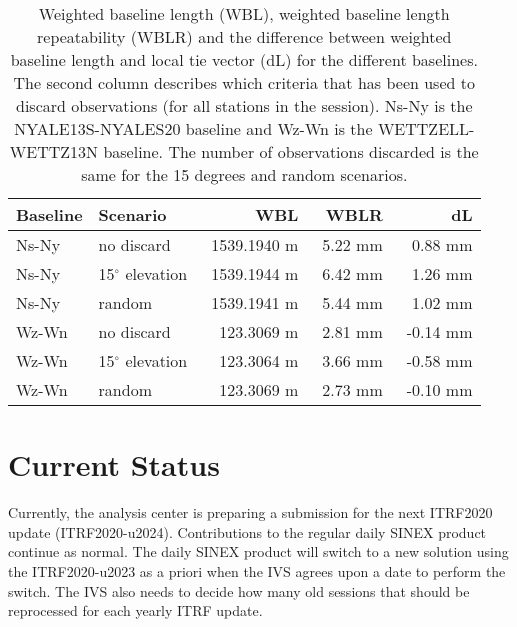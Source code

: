 \documentclass[twocolumn,twoside]{svmultivs_br} %
\begin{document}
\begin{table}[t]
	\begin{tabularx}{\linewidth}{X|l|r|r|r}
	Baseline & Scenario & WBL & WBLR & dL \\
	\hline
	Ns-Ny & no discard  & ~1539.1940 m & ~5.22 mm &  ~0.88 mm \\
	Ns-Ny & {15$^\circ$} elevation & ~1539.1944 m & ~6.42 mm &  ~1.26 mm \\
	Ns-Ny & random       & ~1539.1941 m & ~5.44 mm &  ~1.02 mm \\
	\hline
	Wz-Wn & no discard  &  ~123.3069 m & ~2.81 mm & ~-0.14 mm \\
	Wz-Wn & {15$^\circ$} elevation &  ~123.3064 m & ~3.66 mm & ~-0.58 mm \\
	Wz-Wn & random       &  ~123.3069 m & ~2.73 mm & ~-0.10 mm \\
	\hline
	\end{tabularx}
\caption{{Weighted baseline length (WBL), weighted baseline length repeatability (WBLR) and the difference 
between weighted baseline length and local tie vector (dL) for the different baselines. The second column describes which
criteria that has been used to discard observations (for all stations in the session). Ns-Ny is the NYALE13S-NYALES20 
baseline and Wz-Wn is the WETTZELL-WETTZ13N baseline. The number of observations discarded is the same for the 15 degrees
and random scenarios.
}}
\label{tab:baselines}
\end{table}

%
\section{Current Status}
%
Currently, the analysis center is preparing a submission for the next ITRF2020 update (ITRF2020-u2024). Contributions to the
regular daily SINEX product continue as normal. The daily SINEX product will switch to a new solution using the ITRF2020-u2023 
as a priori when the IVS agrees upon a date to perform the switch. The IVS also needs to decide how many old sessions that should
be reprocessed for each yearly ITRF update. 
%
\end{document}
